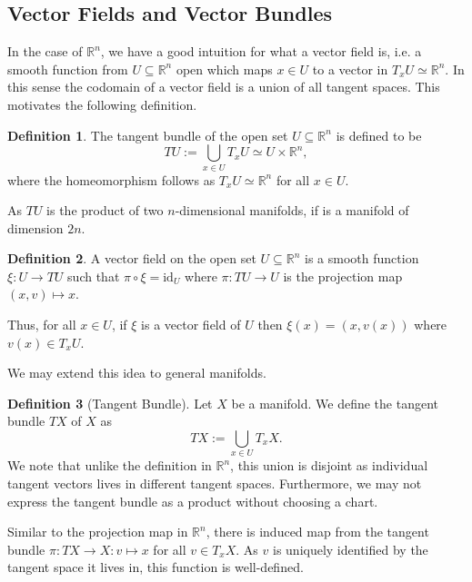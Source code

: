 \documentclass[]{article}
\theoremstyle{definition}
\theoremstyle{definition}
\newtheorem{definition}{Definition}[section]
\begin{document}
\subsection{Vector Fields and Vector Bundles}

In the case of \(\mathbb{R}^n\), we have a good intuition for what a vector field
is, i.e. a smooth function from \(U \subseteq \mathbb{R}^n\) open which maps 
\(x \in U\) to a vector in \(T_x U \simeq \mathbb{R}^n\). In this sense the 
codomain of a vector field is a union of all tangent spaces. This motivates the 
following definition.

\begin{definition}
  The tangent bundle of the open set \(U \subseteq \mathbb{R}^n\) is defined 
  to be 
  \[TU := \bigcup_{x \in U} T_x U \simeq U \times \mathbb{R}^n,\]
  where the homeomorphism follows as \(T_x U \simeq \mathbb{R}^n\) for all 
  \(x \in U\).
\end{definition}

As \(TU\) is the product of two \(n\)-dimensional manifolds, if is a manifold 
of dimension \(2n\).

\begin{definition}
  A vector field on the open set \(U \subseteq \mathbb{R}^n\) is a smooth 
  function \(\xi : U \to TU\) such that \(\pi \circ \xi = \text{id}_U\) where 
  \(\pi : TU \to U\) is the projection map \((x, v) \mapsto x\).
\end{definition}

Thus, for all \(x \in U\), if \(\xi\) is a vector field of \(U\) then 
\(\xi(x) = (x, v(x))\) where \(v(x) \in T_x U\).

We may extend this idea to general manifolds.

\begin{definition}[Tangent Bundle]
  Let \(X\) be a manifold. We define the tangent bundle \(TX\) of \(X\) as 
  \[TX := \bigcup_{x \in U} T_x X.\]
  We note that unlike the definition in \(\mathbb{R}^n\), this union is 
  disjoint as individual tangent vectors lives in different tangent spaces.
  Furthermore, we may not express the tangent bundle as a product without 
  choosing a chart. 
\end{definition}

Similar to the projection map in \(\mathbb{R}^n\), there is induced map 
from the tangent bundle \(\pi : TX \to X : v \mapsto x\) for all \(v \in T_x X\).
As \(v\) is uniquely identified by the tangent space it lives in, this function 
is well-defined.
\end{document}
